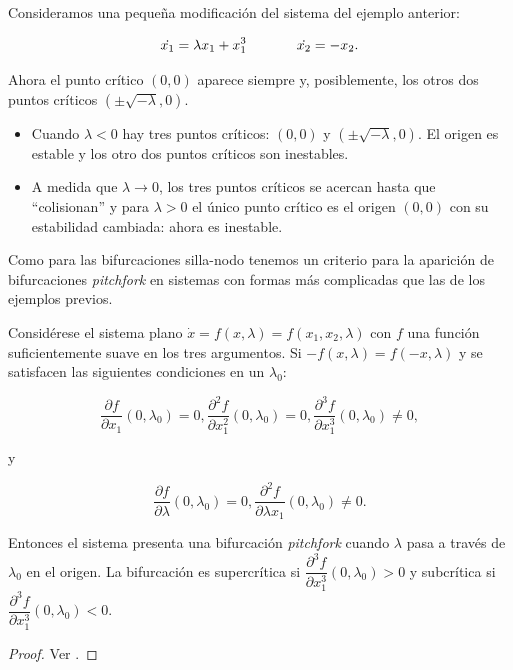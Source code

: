 \begin{example}
Consideramos una pequeña modificación del sistema del ejemplo anterior:

$$ 
	\dot{x_1} = \lambda x_1 + x_1^3 \hspace{0.5in} \dot{x_2} = -x_2.
$$

Ahora el punto crítico $(0,0)$ aparece siempre y, posiblemente, los otros dos puntos críticos $(\pm \sqrt{-\lambda}, 0)$.

\begin{itemize}
	\item Cuando $\lambda < 0$ hay tres puntos críticos: $(0,0)$ y $(\pm \sqrt{-\lambda}, 0)$. El origen es estable y los otro dos puntos críticos son inestables.
	\item A medida que $\lambda \to 0$, los tres puntos críticos se acercan hasta que ``colisionan'' y para $\lambda > 0$ el único punto crítico es el origen $(0,0)$ con su estabilidad cambiada: ahora es inestable.
\end{itemize}


\end{example}

Como para las bifurcaciones silla-nodo tenemos un criterio para la aparición de bifurcaciones \textit{pitchfork} en sistemas con formas más complicadas que las de los ejemplos previos.

\begin{theorem}
Considérese el sistema plano $\dot{x} = f(x, \lambda) = f(x_1, x_2, \lambda)$ con $f$ una función suficientemente suave en los tres argumentos. Si $-f(x, \lambda) = f(-x, \lambda)$ y se satisfacen las siguientes condiciones en un $\lambda_0$:

$$
	\dfrac{\partial f}{\partial x_1}(0, \lambda_0) = 0, \dfrac{\partial^2 f}{\partial x_1^2}(0, \lambda_0) = 0, 
	\dfrac{\partial^3 f}{\partial x_1^3}(0, \lambda_0) \neq 0, 
$$

y

$$
	\dfrac{\partial f}{\partial \lambda}(0, \lambda_0) = 0, \dfrac{\partial^2 f}{\partial \lambda x_1}(0, \lambda_0) \neq 0.
$$

Entonces el sistema presenta una bifurcación \textit{pitchfork} cuando $\lambda$ pasa a través de $\lambda_0$ en el origen.
La bifurcación es supercrítica si $\dfrac{\partial^3 f}{\partial x_1^3}(0,\lambda_0) > 0$ y subcrítica si $\dfrac{\partial^3 f}{\partial x_1^3}(0,\lambda_0) < 0$.
\begin{proof}
Ver \cite{strogatz,swiggins}.
\end{proof}
\end{theorem}

